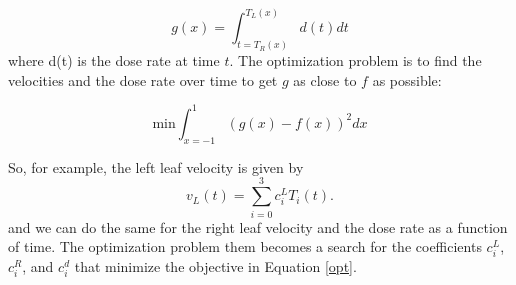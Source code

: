 \begin{equation}
  g(x) = \int_{t = T_R(x)}^{T_L(x)} d(t) dt
\end{equation}
\noindent where d(t) is the dose rate at time $t$.
The optimization problem is to find the velocities and the dose rate over time to get $g$ as close to $f$ as possible:

\begin{equation}
\mathrm{min} \int_{x=-1}^1 \left ( g(x) - f(x) \right )^2 dx
\label{opt}
\end{equation}


So, for example, the left leaf velocity is given by
$$
v_L(t) = \sum_{i=0}^3 c^L_i T_i(t).
$$
\noindent and we can do the same for the right leaf velocity and the dose rate as a function of time.
The optimization problem them becomes a search for the coefficients $c^L_i$, $c^R_i$, and $c^d_i$ that minimize the objective in Equation \ref{opt}.



